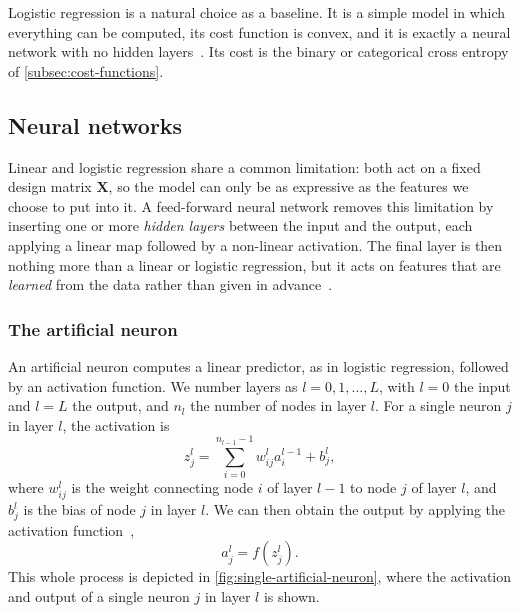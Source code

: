 Logistic regression is a natural choice as a baseline. It is a simple model in which
everything can be computed, its cost function is convex, and it is exactly a neural
network with no hidden layers~\cite{hjorth-jensen_2026}. Its cost is the binary or
categorical cross entropy of \cref{subsec:cost-functions}.

\subsection{Neural networks}\label{subsec:neural-networks}


Linear and logistic regression share a common limitation: both act on a fixed
design matrix $\bm{X}$, so the model can only be as expressive as the features we
choose to put into it. A feed-forward neural network removes this limitation by
inserting one or more \emph{hidden layers} between the input and the output, each applying
a linear map followed by a non-linear activation. The final layer is then nothing more
than a linear or logistic regression, but it acts on features that are \emph{learned} from
the data rather than given in advance~\cite{hjorth-jensen_2026}.

\subsubsection{The artificial neuron}\label{subsubsec:artificial-neuron}

An artificial neuron computes a linear predictor, as in logistic regression, followed
by an activation function. We number layers as $l =0,1,\dots,L$, with $l=0$ the input and
$l=L$ the output, and $n_l$ the number of nodes in layer $l$. For a single neuron $j$ in
layer $l$, the activation is
\begin{equation}\label{eq:single-activation}
    z_j^l = \sum_{i=0}^{n_{l-1}-1} w_{ij}^l a_i^{l-1}+b_j^l,
\end{equation}
where $w_{ij}^l$ is the weight connecting node $i$ of layer $l-1$ to node $j$ of layer $l$,
and $b_j^l$ is the bias of node $j$ in layer $l$. We can then obtain the output by applying
the activation function~\cite{hjorth-jensen_2026},
\begin{equation}\label{eq:single-activation-function}
    a_j^l = f(z_j^l).
\end{equation}
This whole process is depicted in \cref{fig:single-artificial-neuron}, where the activation
and output of a single neuron $j$ in layer $l$ is shown.

